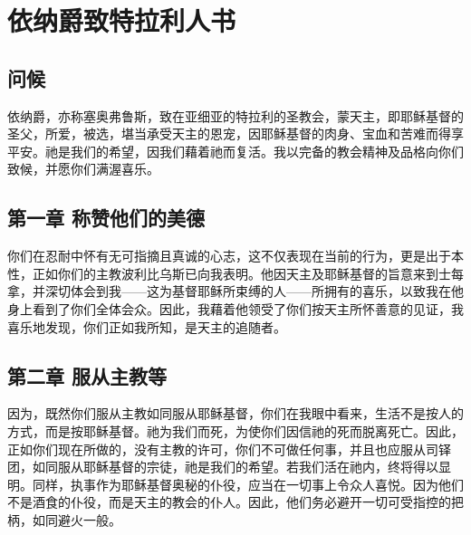 
\chapter{依纳爵致特拉利人书}



\section{问候}

依纳爵，亦称塞奥弗鲁斯，致在亚细亚的特拉利的圣教会，蒙天主，即耶稣基督的圣父，所爱，被选，堪当承受天主的恩宠，因耶稣基督的肉身、宝血和苦难而得享平安。祂是我们的希望，因我们藉着祂而复活。我以完备的教会精神及品格向你们致候，并愿你们满渥喜乐。\par


\section{第一章 称赞他们的美德}

你们在忍耐中怀有无可指摘且真诚的心志，这不仅表现在当前的行为，更是出于本性，正如你们的主教波利比乌斯已向我表明。他因天主及耶稣基督的旨意来到士每拿，并深切体会到我——这为基督耶稣所束缚的人——所拥有的喜乐，以致我在他身上看到了你们全体会众。因此，我藉着他领受了你们按天主所怀善意的见证，我喜乐地发现，你们正如我所知，是天主的追随者。\par


\section{第二章 服从主教等}

因为，既然你们服从主教如同服从耶稣基督，你们在我眼中看来，生活不是按人的方式，而是按耶稣基督。祂为我们而死，为使你们因信祂的死而脱离死亡。因此，正如你们现在所做的，没有主教的许可，你们不可做任何事，并且也应服从司铎团，如同服从耶稣基督的宗徒，祂是我们的希望。若我们活在祂内，终将得以显明。同样，执事作为耶稣基督奥秘的仆役，应当在一切事上令众人喜悦。因为他们不是酒食的仆役，而是天主的教会的仆人。因此，他们务必避开一切可受指控的把柄，如同避火一般。\par

